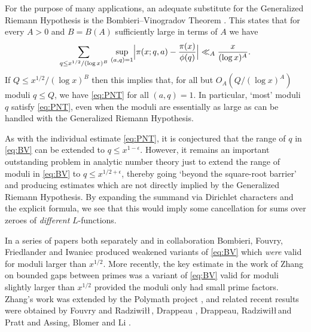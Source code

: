 \documentclass[10pt]{amsart}
\theoremstyle{plain}
\numberwithin{equation}{section}
\begin{document}
For the purpose of many applications, an adequate substitute for the Generalized Riemann Hypothesis is the Bombieri--Vinogradov Theorem \cite{Bombieri,Vinogradov}. This states that for every $A>0$ and $B=B(A)$ sufficiently large in terms of $A$ we have
%
\begin{equation}
\sum_{q\le x^{1/2}/(\log{x})^B}\,\sup_{(a,q)=1}\Bigl|\pi(x;q,a)-\frac{\pi(x)}{\phi(q)}\Bigr|\ll_A\frac{x}{(\log{x})^A}.
\label{eq:BV}
\end{equation}
%
If $Q\le x^{1/2}/(\log{x})^B$ then this implies that, for all but $O_A(Q/(\log{x})^A)$ moduli $q\le Q$, we have \eqref{eq:PNT} for all $(a,q)=1$. In particular, `most' moduli $q$ satisfy \eqref{eq:PNT}, even when the moduli are essentially as large as can be handled with the Generalized Riemann Hypothesis.

As with the individual estimate \eqref{eq:PNT}, it is conjectured \cite{ElliottHalberstam} that the range of $q$ in \eqref{eq:BV} can be extended to $q\le x^{1-\epsilon}$. However, it remains an important outstanding problem in analytic number theory just to extend the range of moduli in \eqref{eq:BV} to $q\le x^{1/2+\epsilon}$, thereby going `beyond the square-root barrier' and producing estimates which are not directly implied by the Generalized Riemann Hypothesis. By expanding the summand via Dirichlet characters and the explicit formula, we see that this would imply some cancellation for sums over zeroes of \emph{different} $L$-functions.

In a series of papers \cite{Fouvry,Fouvry2,Fouvry3,Fouvry4,FouvryIwaniec,FouvryIwaniec2,BFI1,BFI2,BFI3} both separately and in collaboration  Bombieri, Fouvry, Friedlander and Iwaniec produced weakened variants of \eqref{eq:BV} which \emph{were} valid for moduli larger than $x^{1/2}$. More recently, the key estimate in the work of Zhang \cite{Zhang} on bounded gaps between primes was a variant of \eqref{eq:BV} valid for moduli slightly larger than $x^{1/2}$ provided the moduli only had small prime factors. Zhang's work was extended by the Polymath project \cite{Polymath}, and related recent results were obtained by Fouvry and Radziwi\l\l \,\cite{FouvryRadziwill,FouvryRadziwill2}, Drappeau \cite{Drappeau}, Drappeau, Radziwi\l\l \,and Pratt \cite{DrappeauPratt} and Assing, Blomer and Li \cite{Blomer}.
\end{document}
